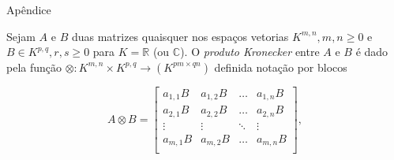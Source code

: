 \documentclass{beamer}
\newcommand{\R}{\mathbb{R}}
\newcommand{\C}{\mathbb{C}}
\theoremstyle{plain}
\theoremstyle{definition}
\begin{document}

\begin{frame}{Apêndice}

    \small
    \begin{definition}
        \label{apendices:def:kronecker_product}
        Sejam $A$ e $B$ duas matrizes quaisquer nos espaços vetorias $K^{m, n}, m,n \geq 0$ e $B \in K^{p, q}, r,s \geq 0$ 
        para $K = \R$ (ou $\C$). O \textit{produto Kronecker} entre $A$ e $B$ é dado pela função
        $\otimes: K^{m, n} \times K^{p, q} \to (K^{pm \times qn})$ definida notação por blocos

        \noindent
        \[
            A \otimes B = 
            \begin{bmatrix}
                a_{1,1} B & a_{1,2} B & \dots & a_{1, n} B \\
                a_{2,1} B & a_{2,2} B & \dots & a_{2, n} B \\
                \vdots & \vdots & \ddots & \vdots \\
                a_{m,1} B & a_{m,2} B & \dots & a_{m, n} B \\
            \end{bmatrix},
        \]


    \end{definition}

     
\end{frame}


\end{document}
